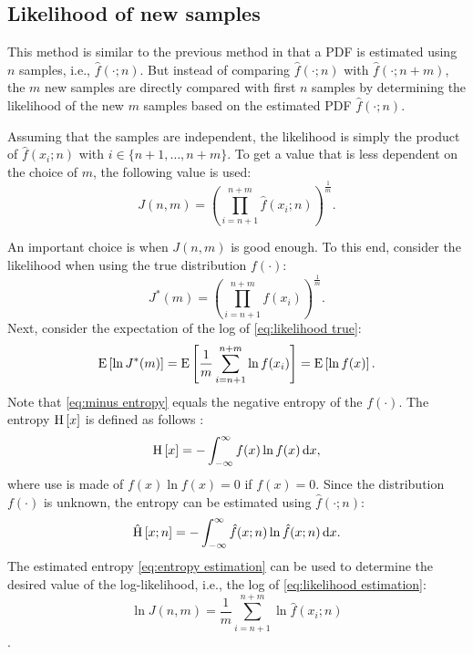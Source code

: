 \documentclass[10pt,final,a4paper,oneside,onecolumn]{article}
\newcommand*{\ud}{\mathrm{\,d}}                                 %
\newcommand{\expectation}[1]{\textup{E} \left[ #1 \right]}
\newcommand{\entropy}[1]{\textup{H} \left[ #1 \right]}
\newcommand{\hatentropy}[1]{\hat{\textup{H}} \left[ #1 \right]}
\newcommand{\intinf}{\int_{-\infty}^{\infty}}
\theoremstyle{plain}\newtheorem{definition}{Definition}[section]    %
\theoremstyle{definition}\newtheorem{example}{Example}[section]     %
\theoremstyle{remark}\newtheorem{remarkenv}{Remark}[section]        %
\begin{document}
\subsection{Likelihood of new samples}
\label{sec:likelihood sample based}

This method is similar to the previous method in that a PDF is estimated using $n$ samples, i.e., $\hat{f}(\cdot;n)$. But instead of comparing $\hat{f}(\cdot;n)$ with $\hat{f}(\cdot;n+m)$, the $m$ new samples are directly compared with first $n$ samples by determining the likelihood of the new $m$ samples based on the estimated PDF $\hat{f}(\cdot;n)$. 

Assuming that the samples are independent, the likelihood is simply the product of $\hat{f}(x_i;n)$ with $i \in \{n+1, \ldots, n+m\}$. To get a value that is less dependent on the choice of $m$, the following value is used:
\begin{equation} \label{eq:likelihood estimation}
	J(n, m) = \left( \prod_{i=n+1}^{n+m} \hat{f}(x_i;n) \right)^{\frac{1}{m}}.
\end{equation}

\cbstart
An important choice is when $J(n, m)$ is good enough. To this end, consider the likelihood when using the true distribution $f(\cdot)$:
\begin{equation} \label{eq:likelihood true}
	J^*(m) = \left( \prod_{i=n+1}^{n+m} f(x_i) \right)^{\frac{1}{m}}.
\end{equation}
Next, consider the expectation of the log of \cref{eq:likelihood true}:
\begin{equation} \label{eq:minus entropy}
	\expectation{\ln J^*(m)} = \expectation{ \frac{1}{m}\sum_{i=n+1}^{n+m} \ln f(x_i) } = \expectation{ \ln f(x) }.
\end{equation}
Note that \cref{eq:minus entropy} equals the negative entropy of the $f(\cdot)$. The entropy $\entropy{x}$ is defined as follows \cite{bishop2006pattern}:
\begin{equation} \label{eq:entropy}
	\entropy{x} = -\intinf f(x) \ln f(x) \ud x,
\end{equation}
where use is made of $f(x) \ln f(x) = 0$ if $f(x)=0$. Since the distribution $f(\cdot)$ is unknown, the entropy can be estimated using $\hat{f}(\cdot;n)$:
\begin{equation} \label{eq:entropy estimation}
	\hatentropy{x; n} = -\intinf \hat{f}(x;n) \ln \hat{f}(x;n) \ud x.
\end{equation}
The estimated entropy \cref{eq:entropy estimation} can be used to determine the desired value of the log-likelihood, i.e., the log of \cref{eq:likelihood estimation}:
\begin{equation} \label{eq:loglikelihood estimation}
	\ln J(n, m) = \frac{1}{m} \sum_{i=n+1}^{n+m} \ln \hat{f}(x_i; n)
\end{equation}.
\cbend
\end{document}
